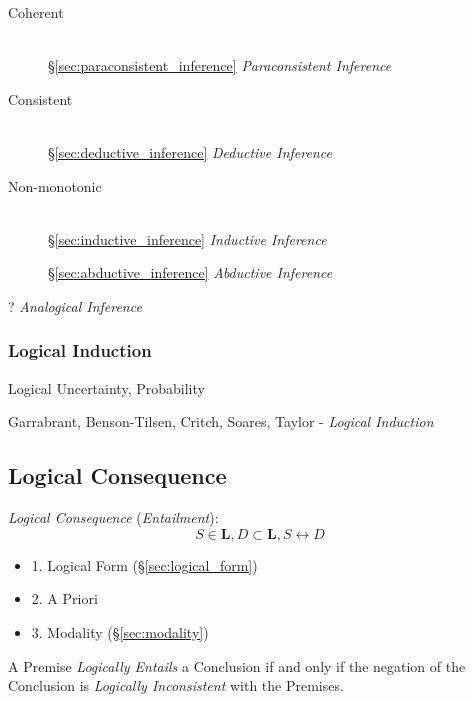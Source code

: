 \begin{description}
\item [Coherent] \hfill\\
  \S\ref{sec:paraconsistent_inference}
  \emph{Paraconsistent Inference}

\item [Consistent] \hfill\\
  \S\ref{sec:deductive_inference} \emph{Deductive Inference}

\item [Non-monotonic] \hfill\\
  \S\ref{sec:inductive_inference} \emph{Inductive Inference}

  \S\ref{sec:abductive_inference} \emph{Abductive Inference}

\end{description}

? \emph{Analogical Inference}



\subsubsection{Logical Induction}\label{sec:logical_induction}

Logical Uncertainty, Probability

Garrabrant, Benson-Tilsen, Critch, Soares, Taylor - \emph{Logical
  Induction} %



\subsection{Logical Consequence}\label{sec:logical_consequence}
\cite{beall-restall05}

\emph{Logical Consequence} (\emph{Entailment}):
\[
  S \in \mathbf{L}, D \subset \mathbf{L}, S \leftrightarrow D
\]
\begin{itemize}
  \item 1. Logical Form (\S\ref{sec:logical_form})
  \item 2. A Priori
  \item 3. Modality (\S\ref{sec:modality})
\end{itemize}

A Premise \emph{Logically Entails} a Conclusion if and only if the
negation of the Conclusion is \emph{Logically Inconsistent} with the
Premises.



